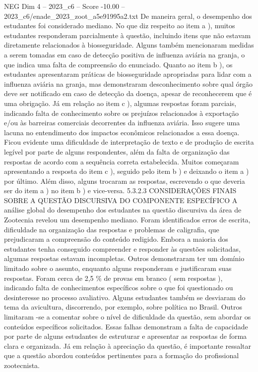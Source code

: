 \begin{textsample}{NEG Dim 4 – 2023\_c6 – Score -10.00 – 2023\_c6/enade\_2023\_zoot\_a5e91995a2.txt}
De maneira geral, o desempenho dos estudantes foi considerado mediano.
No que diz respeito ao item a ), muitos estudantes responderam parcialmente à questão, incluindo itens que não estavam diretamente relacionados à biosseguridade.
Alguns também mencionaram medidas a serem tomadas em caso de detecção positiva de influenza aviária na granja, o que indica uma falta de compreensão do enunciado.
Quanto ao item b ), os estudantes apresentaram práticas de biosseguridade apropriadas para lidar com a influenza aviária na granja, mas demonstraram desconhecimento sobre qual órgão deve ser notificado em caso de detecção da doença, apesar de reconhecerem que é uma obrigação.
Já em relação ao item c ), algumas respostas foram parciais, indicando falta de conhecimento sobre os prejuízos relacionados à exportação e/ou às barreiras comerciais decorrentes da influenza aviária.
Isso sugere uma lacuna no entendimento dos impactos econômicos relacionados a essa doença.
Ficou evidente uma dificuldade de interpretação de texto e de produção de escrita legível por parte de alguns respondentes, além da falta de organização das respostas de acordo com a sequência correta estabelecida.
Muitos começaram apresentando a resposta do item c ), seguido pelo item b ) e deixando o item a ) por último.
Além disso, alguns trocaram as respostas, escrevendo o que deveria ser do item a ) no item b ) e vice-versa. 5.3.2.3 CONSIDERAÇÕES FINAIS SOBRE A QUESTÃO DISCURSIVA DO COMPONENTE ESPECÍFICO A análise global do desempenho dos estudantes na questão discursiva da área de Zootecnia revelou um desempenho mediano.
Foram identificados erros de escrita, dificuldade na organização das respostas e problemas de caligrafia, que prejudicaram a compreensão do conteúdo redigido.
Embora a maioria dos estudantes tenha conseguido compreender e responder às questões solicitadas, algumas respostas estavam incompletas.
Outros demonstraram ter um domínio limitado sobre o assunto, enquanto alguns responderam e justificaram suas respostas.
Foram cerca de 2,5 \% de provas em branco ( sem respostas ), indicando falta de conhecimentos específicos sobre o que foi questionado ou desinteresse no processo avaliativo.
Alguns estudantes também se desviaram do tema da avicultura, discorrendo, por exemplo, sobre política no Brasil.
Outros limitaram -se a comentar sobre o nível de dificuldade da questão, sem abordar os conteúdos específicos solicitados.
Essas falhas demonstram a falta de capacidade por parte de alguns estudantes de estruturar e apresentar as respostas de forma clara e organizada.
Já em relação à apreciação da questão, é importante ressaltar que a questão abordou conteúdos pertinentes para a formação do profissional zootecnista.

\end{textsample}
